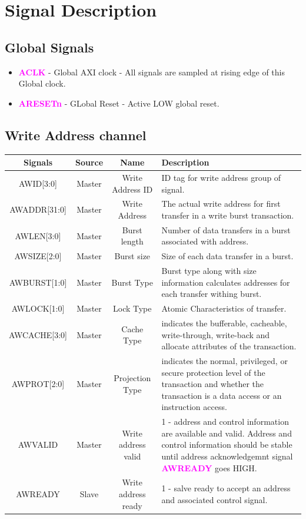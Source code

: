\documentclass{article}
\newcommand{\AXISignals}[1]{\textbf{\textcolor{magenta}{#1}}}
\begin{document}
\section{Signal Description}
\subsection{Global Signals}
\begin{itemize}
    \item \AXISignals{ACLK} - Global AXI clock - All signals are sampled at rising edge of this Global clock.
    \item \AXISignals{ARESETn} - GLobal Reset - Active LOW global reset.
\end{itemize}

\subsection{Write Address channel}
\begin{table}[H]
    \begin{center}
        \begin{tabular}{c|c|c|p{9.5cm}}
            \textbf{Signals} & \textbf{Source} & \textbf{Name} & \textbf{Description}\\
            \hline
            AWID[3:0] & Master & Write Address ID & ID tag for write address group of signal.\\
            AWADDR[31:0] & Master & Write Address & The actual write address for first transfer in a write burst transaction.\\
            AWLEN[3:0] & Master & Burst length & Number of data transfers in a burst associated with address.\\
            AWSIZE[2:0] & Master & Burst size & Size of each data transfer in a burst.\\
            AWBURST[1:0] & Master & Burst Type & Burst type along with size information calculates addresses for each transfer withing burst.\\
            AWLOCK[1:0] & Master & Lock Type & Atomic Characteristics of transfer.\\
            AWCACHE[3:0] & Master & Cache Type & indicates the bufferable, cacheable, write-through, write-back and allocate attributes of the transaction.\\
            AWPROT[2:0] & Master & Projection Type & indicates the normal, privileged, or secure protection level of the transaction and whether the transaction is a data access or an instruction access.\\
            AWVALID & Master & Write address valid & 1 - address and control information are available and valid. Address and control information should be stable until address acknowledgemnt signal \AXISignals{AWREADY} goes HIGH.\\
            AWREADY & Slave & Write address ready & 1 - salve ready to accept an address and associated control signal.\\
        \end{tabular}
    \end{center}
\end{table}
\end{document}
